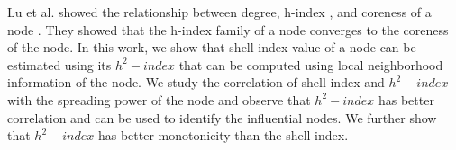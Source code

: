 \documentclass[conference]{IEEEtran}
\begin{document}



Lu et al. showed the relationship between degree, h-index \cite{hirsch2005index}, and coreness of a node \cite{lu2016h}. They showed that the h-index family of a node converges to the coreness of the node. In this work, we show that shell-index value of a node can be estimated using its $h^2-index$ that can be computed using local neighborhood information of the node. We study the correlation of shell-index and $h^2-index$ with the spreading power of the node and observe that $h^2-index$ has better correlation and can be used to identify the influential nodes. We further show that $h^2-index$ has better monotonicity than the shell-index. 
\end{document}
